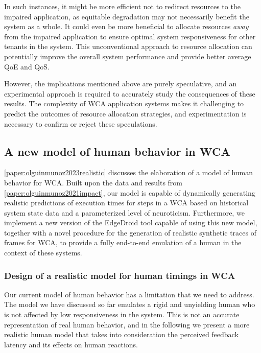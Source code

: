In such instances, it might be more efficient not to redirect resources to the impaired application, as equitable degradation may not necessarily benefit the system as a whole.
It could even be more beneficial to allocate resources \emph{away} from the impaired application to ensure optimal system responsiveness for other tenants in the system.
This unconventional approach to resource allocation can potentially improve the overall system performance and provide better average \gls{QoE} and \gls{QoS}.

However, the implications mentioned above are purely speculative, and an experimental approach is required to accurately study the consequences of these results.
The complexity of \gls{WCA} application systems makes it challenging to predict the outcomes of resource allocation strategies, and experimentation is necessary to confirm or reject these speculations.

\subsection{A new model of human behavior in \acs{WCA}}

\cref{paper:olguinmunoz2023realistic} discusses the elaboration of a model of human behavior for \gls{WCA}.
Built upon the data and results from \cref{paper:olguinmunoz2021impact}, our model is capable of dynamically generating realistic predictions of execution times for steps in a \gls{WCA} based on historical system state data and a parameterized level of neuroticism.
Furthermore, we implement a new version of the EdgeDroid tool capable of using this new model, together with a novel procedure for the generation of realistic synthetic traces of frames for \gls{WCA}, to provide a fully end-to-end emulation of a human in the context of these systems.

\subsubsection{Design of a realistic model for human timings in \gls{WCA}}\label{sec:improved_model}

Our current model of human behavior has a limitation that we need to address.
The model we have discussed so far emulates a rigid and unyielding human who is not affected by low responsiveness in the system.
This is not an accurate representation of real human behavior, and in the following we present a more realistic human model that takes into consideration the perceived feedback latency and its effects on human reactions.

